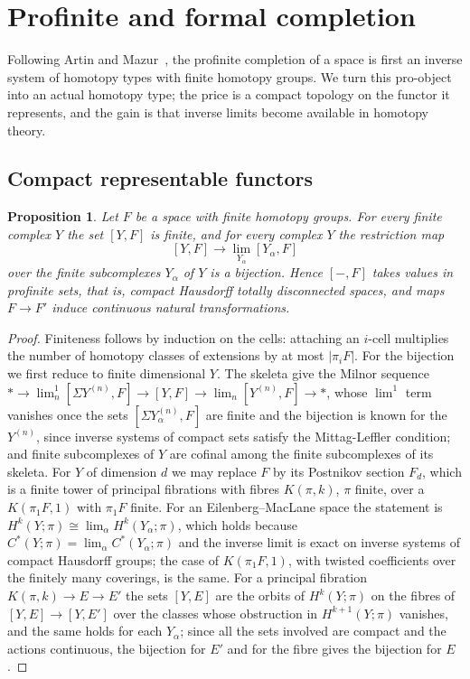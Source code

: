 \documentclass[11pt]{amsart}
\theoremstyle{plain}
\newtheorem{proposition}[theorem]{Proposition}
\theoremstyle{definition}
\numberwithin{equation}{section}
\begin{document}
\section{Profinite and formal completion}\label{sec:completion}

Following Artin and Mazur~\cite{ArtinMazur}, the profinite completion of a space is first an inverse system of homotopy types with finite homotopy groups.
We turn this pro-object into an actual homotopy type; the price is a compact topology on the functor it represents, and the gain is that inverse limits become available in homotopy theory.

\subsection{Compact representable functors}

\begin{proposition}\label{prop:compactfunctor}
Let $F$ be a space with finite homotopy groups.
For every finite complex $Y$ the set $[Y,F]$ is finite, and for every complex $Y$ the restriction map
\[
[Y,F]\longrightarrow\lim_{Y_\alpha}[Y_\alpha,F]
\]
over the finite subcomplexes $Y_\alpha$ of $Y$ is a bijection.
Hence $[-,F]$ takes values in profinite sets, that is, compact Hausdorff totally disconnected spaces, and maps $F\to F'$ induce continuous natural transformations.
\end{proposition}

\begin{proof}
Finiteness follows by induction on the cells: attaching an $i$-cell multiplies the number of homotopy classes of extensions by at most $|\pi_iF|$.
For the bijection we first reduce to finite dimensional $Y$.
The skeleta give the Milnor sequence $*\to\lim^1_n[\Sigma Y^{(n)},F]\to[Y,F]\to\lim_n[Y^{(n)},F]\to*$, whose $\lim^1$ term vanishes once the sets $[\Sigma Y^{(n)}_\alpha,F]$ are finite and the bijection is known for the $Y^{(n)}$, since inverse systems of compact sets satisfy the Mittag-Leffler condition; and finite subcomplexes of $Y$ are cofinal among the finite subcomplexes of its skeleta.
For $Y$ of dimension $d$ we may replace $F$ by its Postnikov section $F_d$, which is a finite tower of principal fibrations with fibres $K(\pi,k)$, $\pi$ finite, over a $K(\pi_1F,1)$ with $\pi_1F$ finite.
For an Eilenberg--MacLane space the statement is $H^k(Y;\pi)\cong\lim_\alpha H^k(Y_\alpha;\pi)$, which holds because $C^*(Y;\pi)=\lim_\alpha C^*(Y_\alpha;\pi)$ and the inverse limit is exact on inverse systems of compact Hausdorff groups; the case of $K(\pi_1F,1)$, with twisted coefficients over the finitely many coverings, is the same.
For a principal fibration $K(\pi,k)\to E\to E'$ the sets $[Y,E]$ are the orbits of $H^k(Y;\pi)$ on the fibres of $[Y,E]\to[Y,E']$ over the classes whose obstruction in $H^{k+1}(Y;\pi)$ vanishes, and the same holds for each $Y_\alpha$; since all the sets involved are compact and the actions continuous, the bijection for $E'$ and for the fibre gives the bijection for $E$.
\end{proof}
\end{document}
